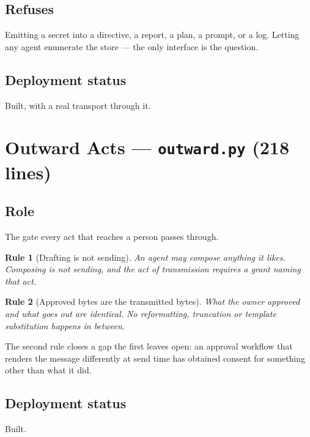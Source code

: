 \documentclass[11pt]{article}
\newtheorem{drule}{Rule}
\newcommand{\code}[1]{\texttt{\small #1}}
\begin{document}
\subsection{Refuses}

Emitting a secret into a directive, a report, a plan, a prompt, or a log. Letting any agent enumerate the store --- the only interface is the question.

\subsection{Deployment status}

Built, with a real transport through it.

\section{Outward Acts --- \code{outward.py} (218 lines)}
\label{sec:outward}

\subsection{Role}

The gate every act that reaches a person passes through.

\begin{drule}[Drafting is not sending]
\label{rule:drafting}
An agent may compose anything it likes. Composing is not sending, and the act of transmission requires a grant naming that act.
\end{drule}

\begin{drule}[Approved bytes are the transmitted bytes]
\label{rule:bytes}
What the owner approved and what goes out are identical. No reformatting, truncation or template substitution happens in between.
\end{drule}

The second rule closes a gap the first leaves open: an approval workflow that renders the message differently at send time has obtained consent for something other than what it did.

\subsection{Deployment status}

Built.

\end{document}
